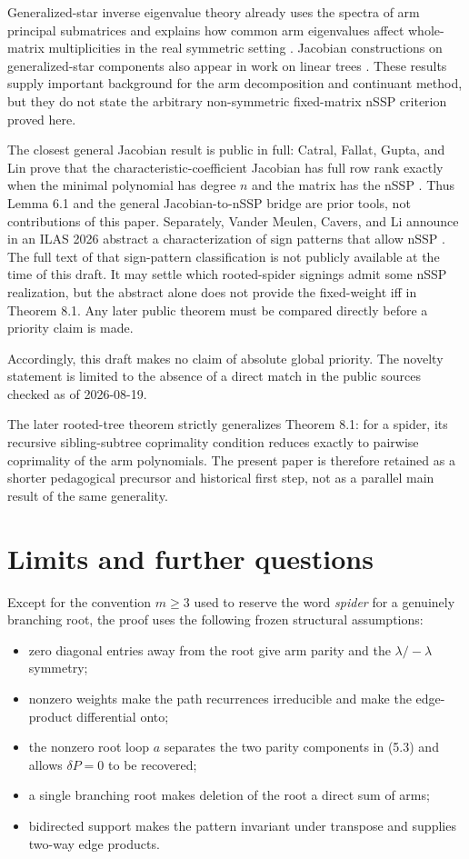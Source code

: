 \documentclass[11pt]{article}
\theoremstyle{remark}
\begin{document}
Generalized-star inverse eigenvalue theory already uses the spectra of arm principal submatrices and explains how common arm eigenvalues affect whole-matrix multiplicities in the real symmetric setting \cite{ref4}. Jacobian constructions on generalized-star components also appear in work on linear trees \cite{ref5}. These results supply important background for the arm decomposition and continuant method, but they do not state the arbitrary non-symmetric fixed-matrix nSSP criterion proved here.

The closest general Jacobian result is public in full: Catral, Fallat, Gupta, and Lin prove that the characteristic-coefficient Jacobian has full row rank exactly when the minimal polynomial has degree $n$ and the matrix has the nSSP \cite[Theorem 5.1]{ref2}. Thus Lemma 6.1 and the general Jacobian-to-nSSP bridge are prior tools, not contributions of this paper. Separately, Vander Meulen, Cavers, and Li announce in an ILAS 2026 abstract a characterization of sign patterns that allow nSSP \cite{ref7}. The full text of that sign-pattern classification is not publicly available at the time of this draft. It may settle which rooted-spider signings admit some nSSP realization, but the abstract alone does not provide the fixed-weight iff in Theorem 8.1. Any later public theorem must be compared directly before a priority claim is made.

Accordingly, this draft makes no claim of absolute global priority. The novelty statement is limited to the absence of a direct match in the public sources checked as of 2026-08-19.

The later rooted-tree theorem \cite{ref15} strictly generalizes Theorem 8.1:
for a spider, its recursive sibling-subtree coprimality condition reduces
exactly to pairwise coprimality of the arm polynomials.  The present paper is
therefore retained as a shorter pedagogical precursor and historical first
step, not as a parallel main result of the same generality.

\section{Limits and further questions}

Except for the convention $m\ge3$ used to reserve the word \emph{spider} for a genuinely branching root, the proof uses the following frozen structural assumptions:

\begin{itemize}
\item zero diagonal entries away from the root give arm parity and the $\lambda/-\lambda$ symmetry;
\item nonzero weights make the path recurrences irreducible and make the edge-product differential onto;
\item the nonzero root loop $a$ separates the two parity components in (5.3) and allows $\delta P=0$ to be recovered;
\item a single branching root makes deletion of the root a direct sum of arms;
\item bidirected support makes the pattern invariant under transpose and supplies two-way edge products.

\end{itemize}
\end{document}
